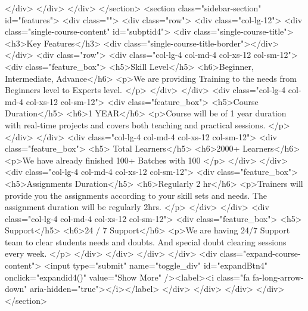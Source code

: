 {</div>
</div>
</div>
</section>
<section class="sidebar-section" id="features">
<div class="">
<div class="row">
<div class="col-lg-12">
<div class="single-course-content" id="subptid4">
<div class="single-course-title">
<h3>Key Features</h3>
<div class="single-course-title-border"></div>
</div>
<div class="row">
<div class="col-lg-4 col-md-4 col-xs-12 col-sm-12">
<div class="feature_box">
<h5>Skill Level</h5>
<h6>Beginner, Intermediate, Advance</h6>
<p>We are providing Training to the needs from Beginners level to Experts level.
</p>
</div>
</div>
<div class="col-lg-4 col-md-4 col-xs-12 col-sm-12">
<div class="feature_box">
<h5>Course Duration</h5>
<h6>1 YEAR</h6>
<p>Course will be of 1 year duration with real-time projects and covers both teaching and practical sessions.
</p>
</div>
</div>
<div class="col-lg-4 col-md-4 col-xs-12 col-sm-12">
<div class="feature_box">
<h5> Total Learners</h5>
<h6>2000+ Learners</h6>
<p>We have already finished 100+ Batches with 100%
</p>
</div>
</div>
<div class="col-lg-4 col-md-4 col-xs-12 col-sm-12">
<div class="feature_box">
<h5>Assignments Duration</h5>
<h6>Regularly 2 hr</h6>
<p>Trainers will provide you the assignments according to your skill sets and needs. The assignment duration will be regularly 2hrs. </p>
</div>
</div>
<div class="col-lg-4 col-md-4 col-xs-12 col-sm-12">
<div class="feature_box">
<h5> Support</h5>
<h6>24 / 7 Support</h6>
<p>We are having 24/7 Support team to clear students needs and doubts.
And special doubt clearing sessions every week.
</p>
</div>
</div>
</div>
</div>
<div class="expand-course-content">
<input type="submit" name="toggle_div" id="expandBtn4" onclick="expandid4()" value="Show More" /><label><i class="fa fa-long-arrow-down" aria-hidden="true"></i></label>
</div>
</div>
</div>
</div>
</section>

}
